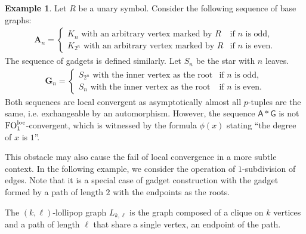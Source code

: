 \documentclass[11pt]{article}
\theoremstyle{plain}
\theoremstyle{definition}
\newtheorem{example}{Example}
\theoremstyle{remark}
\DeclareMathOperator\FO{FO}
\newcommand{\FOloc}[1]{\FO_{#1}^\textnormal{loc}}
\newcommand{\str}[1]{\mathbf{#1}}
\newcommand{\strseq}[1]{{\boldsymbol{\mathsf{#1}}}}
\begin{document}
\begin{example}\label{ex:basic_fluctuation}
    Let $R$ be a unary symbol.
    Consider the following sequence of base graphs:
    \begin{align*}
        \str{A}_n =
        \begin{cases}
            K_n\text{ with an arbitrary vertex marked by $R$} & \text{if $n$ is odd}
            , \\
            K_{2^n}\text{ with an arbitrary vertex marked by $R$} & \text{if $n$ is even}
            .
        \end{cases}
    \end{align*}
    The sequence of gadgets is defined similarly.
    Let $S_n$ be the star with $n$ leaves.
    \begin{align*}
        \str{G}_n =
        \begin{cases}
            S_{2^n}\text{ with the inner vertex as the root} & \text{if $n$ is odd}
            , \\
            S_n\text{ with the inner vertex as the root} & \text{if $n$ is even}
            .
        \end{cases}
    \end{align*}
    Both sequences are local convergent as asymptotically almost all $p$-tuples are the same, i.e. exchangeable by an automorphism.
    However, the sequence $\strseq{A}*\strseq{G}$ is not $\FOloc{1}$-convergent, which is witnessed by the formula $\phi(x)$ stating ``the degree of $x$ is $1$''.
\end{example}

This obstacle may also cause the fail of local convergence in a more subtle context.
In the following example, we consider the operation of $1$-subdivision of edges.
Note that it is a special case of gadget construction with the gadget formed by a path of length $2$ with the endpoints as the roots.

The $(k,\ell)$-lollipop graph $L_{k,\ell}$ is the graph composed of a clique on $k$ vertices and a path of length $\ell$ that share a single vertex, an endpoint of the path.
\end{document}
